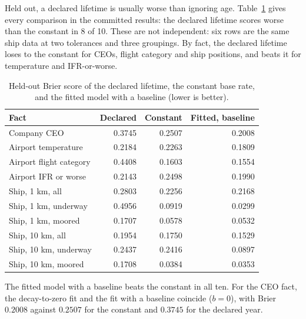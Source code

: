 Held out, a declared lifetime is usually worse than ignoring age.
Table~\ref{tab:declared-brier} gives every comparison in the committed
results: the declared lifetime scores worse than the constant in 8 of 10.
These are not independent: six rows are the same ship data at two
tolerances and three groupings. By fact, the declared lifetime loses to the
constant for CEOs, flight category and ship positions, and beats it for
temperature and IFR-or-worse.

\begin{table}[t]
\centering
\small
\caption{Held-out Brier score of the declared lifetime, the constant base
rate, and the fitted model with a baseline (lower is better).}
\label{tab:declared-brier}
\begin{tabular}{lrrr}
\toprule
Fact & Declared & Constant & Fitted, baseline \\
\midrule
Company CEO & 0.3745 & 0.2507 & 0.2008 \\
Airport temperature & 0.2184 & 0.2263 & 0.1809 \\
Airport flight category & 0.4408 & 0.1603 & 0.1554 \\
Airport IFR or worse & 0.2143 & 0.2498 & 0.1990 \\
Ship, 1 km, all & 0.2803 & 0.2256 & 0.2168 \\
Ship, 1 km, underway & 0.4956 & 0.0919 & 0.0299 \\
Ship, 1 km, moored & 0.1707 & 0.0578 & 0.0532 \\
Ship, 10 km, all & 0.1954 & 0.1750 & 0.1529 \\
Ship, 10 km, underway & 0.2437 & 0.2416 & 0.0897 \\
Ship, 10 km, moored & 0.1708 & 0.0384 & 0.0353 \\
\bottomrule
\end{tabular}
\end{table}

The fitted model with a baseline beats the constant in all ten. For the
CEO fact, the decay-to-zero fit and the fit with a baseline coincide
($b = 0$), with Brier $0.2008$ against $0.2507$ for the constant and
$0.3745$ for the declared year.


